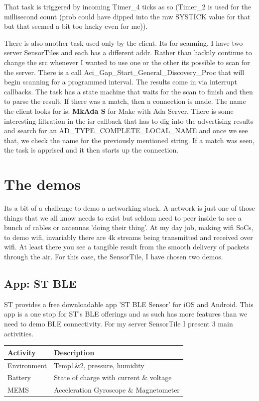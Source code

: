 \documentclass[11pt]{article}
\numberwithin{figure}{section}
\begin{document}
{
\selectfont

}

That task is triggered by incoming Timer\_4 ticks as so (Timer\_2 is used
for the millisecond count (prob could have dipped into the raw SYSTICK
value for that but that seemed a bit too hacky even for me)).

{
\selectfont

}

There is also another task used only by the client. Its for
scanning. I have two server SensorTiles and each has a different
addr. Rather than hackily continue to change the src whenever I wanted
to use one or the other its possible to scan for the server. There is a
call Aci\_Gap\_Start\_General\_Discovery\_Proc that will begin
scanning for a programmed interval. The results come in via interrupt
callbacks. The task has a state machine that waits for the scan to
finish and then to parse the result. If there was a match, then a
connection is made. The name the client looks for is: \textbf{MkAda S}
for Make with Ada Server. There is some interesting filtration in the
isr callback that has to dig into the advertising results and search
for an AD\_TYPE\_COMPLETE\_LOCAL\_NAME and once we see that, we check
the name for the previously mentioned string. If a match was seen, the
task is apprised and it then starts up the connection.
\section{The demos}
Its a bit of a challenge to demo a networking stack. A network is just
one of those things that we all know needs to exist but seldom need to
peer inside to see a bunch of cables or antennas 'doing their
thing'. At my day job, making wifi SoCs, to demo wifi, invariably there
are 4k streams being transmitted and received over wifi. At least
there you see a tangible result from the smooth delivery of packets
through the air. For this case, the SensorTile, I have chosen two
demos.
\subsection{App: ST BLE}
ST provides a free downloadable app 'ST BLE Sensor' for iOS and
Android. This app is a one stop for ST's BLE offerings and as such has
more features than we need to demo BLE connectivity. For my server
SensorTile I present 3 main activities.
\begin{table}[h]
\begin{tabular}{|l|l|}
\hline
Activity   & Description\\ \hline
Environment & Temp1\&2, pressure, humidity \\ \hline
Battery & State of charge with current \& voltage\\ \hline
MEMS & Acceleration Gyroscope \& Magnetometer\\ \hline
\end{tabular}
\end{table}
\end{document}
